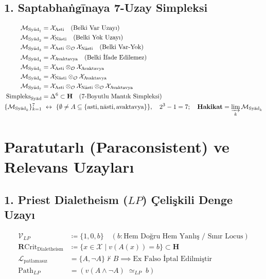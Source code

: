 \documentclass[11pt, a4paper]{article}
\begin{document}
\subsection{1. Saptabhaṅgīnaya 7-Uzay Simpleksi}
\begin{align}
\mathcal{M}_{\text{Syād}_1} &= \mathcal{X}_{\text{Asti}} \quad (\text{Belki Var Uzayı}) \\
\mathcal{M}_{\text{Syād}_2} &= \mathcal{X}_{\text{Nāsti}} \quad (\text{Belki Yok Uzayı}) \\
\mathcal{M}_{\text{Syād}_3} &= \mathcal{X}_{\text{Asti}} \otimes_{\mathcal{O}} \mathcal{X}_{\text{Nāsti}} \quad (\text{Belki Var-Yok}) \\
\mathcal{M}_{\text{Syād}_4} &= \mathcal{X}_{\text{Avaktavya}} \quad (\text{Belki İfade Edilemez}) \\
\mathcal{M}_{\text{Syād}_5} &= \mathcal{X}_{\text{Asti}} \otimes_{\mathcal{O}} \mathcal{X}_{\text{Avaktavya}} \\
\mathcal{M}_{\text{Syād}_6} &= \mathcal{X}_{\text{Nāsti}} \otimes_{\mathcal{O}} \mathcal{X}_{\text{Avaktavya}} \\
\mathcal{M}_{\text{Syād}_7} &= \mathcal{X}_{\text{Asti}} \otimes_{\mathcal{O}} \mathcal{X}_{\text{Nāsti}} \otimes_{\mathcal{O}} \mathcal{X}_{\text{Avaktavya}} \\
\text{Simpleks}_{\text{Syād}} &= \Delta^6 \subset \mathbf{H} \quad (7\text{-Boyutlu Mantık Simpleksi}) \\
\{ \mathcal{M}_{\text{Syād}_k} \}_{k=1}^{7} &\ \leftrightarrow \ \{ \emptyset \ne A \subseteq \{\text{asti}, \text{nāsti}, \text{avaktavya}\} \}, \quad 2^3 - 1 = 7; \quad \mathbf{Hakikat} = \varinjlim_k \mathcal{M}_{\text{Syād}_k}
\end{align}

\section{Paratutarlı (Paraconsistent) ve Relevans Uzayları}

\subsection{1. Priest Dialetheism ($LP$) Çelişkili Denge Uzayı}
\begin{align}
\mathcal{V}_{LP} &\coloneqq \{ 1, 0, b \} \quad (b: \text{Hem Doğru Hem Yanlış / Sınır Locus}) \\
\mathbf{R}\text{Crit}_{\text{Dialetheism}} &\coloneqq \{ x \in \mathcal{X} \mid v(A(x)) = b \} \subset \mathbf{H} \\
\mathcal{L}_{\text{patlamasız}} &= \{ A, \neg A \} \nvdash B \implies \text{Ex Falso İptal Edilmiştir} \\
\text{Path}_{LP} &= (v(A \land \neg A) \;\simeq_{LP}\; b)
\end{align}
\end{document}
